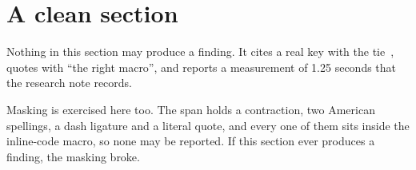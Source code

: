 \section{A clean section}
\label{sec:ch01-clean}

%
Nothing in this section may produce a finding. It cites a real key with the
tie~\autocite{realkey}, quotes with \enquote{the right macro}, and reports a
measurement of 1.25 seconds that the research note records.

Masking is exercised here too. The span 
holds a contraction, two American spellings, a dash ligature and a literal
quote, and every one of them sits inside the inline-code macro, so none may be
reported. If this section ever produces a finding, the masking broke.
